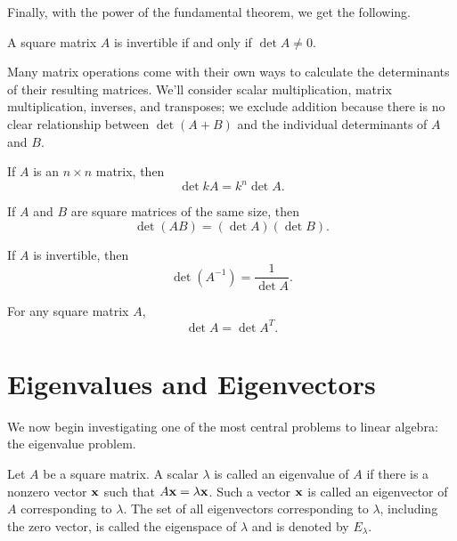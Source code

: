 \documentclass[../m073main.tex]{subfiles}
\begin{document}
Finally, with the power of the fundamental theorem, we get the following.

\begin{theorem}
	A square matrix $A$ is invertible if and only if $\det A \neq 0$.
\end{theorem}

Many matrix operations come with their own ways to calculate the determinants of their resulting matrices.
We'll consider scalar multiplication, matrix multiplication, inverses, and transposes; we exclude addition because there is no clear relationship between $\det (A + B)$ and the individual determinants of $A$ and $B$.

\begin{theorem}
	If $A$ is an $n \times n$ matrix, then
	\[ \det kA = k^n \det A. \]
\end{theorem}

\begin{theorem}
	If $A$ and $B$ are square matrices of the same size, then
	\[ \det (AB) = (\det A)(\det B). \]
\end{theorem}

\begin{theorem}
	If $A$ is invertible, then
	\[ \det (A^{-1}) = \frac{1}{\det A}. \]
\end{theorem}

\begin{theorem}
	For any square matrix $A$,
	\[ \det A = \det A^T. \]
\end{theorem}

\section{Eigenvalues and Eigenvectors}
We now begin investigating one of the most central problems to linear algebra: the eigenvalue problem.

\begin{definition}
	Let $A$ be a square matrix.
	A scalar $\lambda$ is called an eigenvalue of $A$ if there is a nonzero vector $\mathbf{x}$ such that $A \mathbf{x} = \lambda \mathbf{x}$.
	Such a vector $\mathbf{x}$ is called an eigenvector of $A$ corresponding to $\lambda$.
	The set of all eigenvectors corresponding to $\lambda$, including the zero vector, is called the eigenspace of $\lambda$ and is denoted by $E_\lambda$.
\end{definition}
\end{document}
